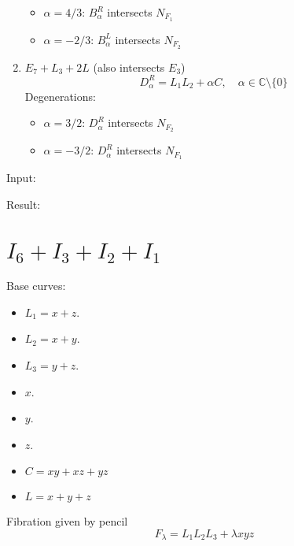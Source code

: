 \documentclass{article}
\newcommand{\C}{\mathbb{C}}
\begin{document}
\begin{enumerate}
\begin{itemize}
      \item $\alpha = 4/3$: $B_\alpha^R$ intersects $N_{F_1}$
      \item $\alpha = -2/3$: $B_\alpha^L$ intersects $N_{F_2}$
  \end{itemize}
  \item $E_7 + L_3 + 2L$ (also intersects $E_3$)
  \[D_{\alpha}^R = L_1L_2 + \alpha C, \quad \alpha \in \C \setminus\{0\}\]
  Degenerations:
  \begin{itemize}
      \item $\alpha = 3/2$: $D_{\alpha}^R$ intersects $N_{F_2}$
      \item $\alpha = -3/2$: $D_{\alpha}^R$ intersects $N_{F_1}$
  \end{itemize}
\end{enumerate}


Input:

Result:



\section{$I_6 + I_3 + I_2 + I_1$}

Base curves:
\begin{itemize}
  \item $L_1 = x+z$.
  \item $L_2 = x+y$.
  \item $L_3 = y+z$.
  \item $x$.
  \item $y$.
  \item $z$.
  \item $C = xy + xz + yz$
  \item $L = x + y + z$
\end{itemize}
Fibration given by pencil
\[F_\lambda = L_1 L_2 L_3 + \lambda xyz\]
\end{document}
